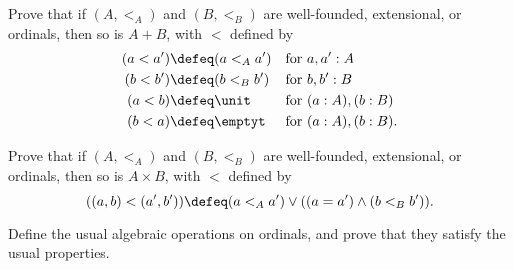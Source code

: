 \begin{ex}\label{ex:add-ordinals}
  Prove that if $(A,<_A)$ and $(B,<_B)$ are well-founded, extensional, or ordinals, then so is $A+B$, with $<$ defined by
  \begin{align*}
    (a<a') &\defeq (a<_A a') & \text{for }& a,a':A\\
    (b<b') &\defeq (b<_B b') & \text{for }& b,b':B\\
    (a<b) &\defeq \unit      & \text{for }& (a:A),(b:B)\\
    (b<a) &\defeq \emptyt    & \text{for }& (a:A),(b:B).
  \end{align*}
\end{ex}

\begin{ex}\label{ex:multiply-ordinals}
  Prove that if $(A,<_A)$ and $(B,<_B)$ are well-founded, extensional, or ordinals, then so is $A\times B$, with $<$ defined by
  \[ ((a,b) <(a',b')) \defeq (a<_A a') \vee ((a=a') \wedge (b<_B b')). \]
\end{ex}

\begin{ex}\label{ex:algebraic-ordinals}
  Define the usual algebraic operations on ordinals, and prove that they satisfy the usual properties.
\end{ex}

